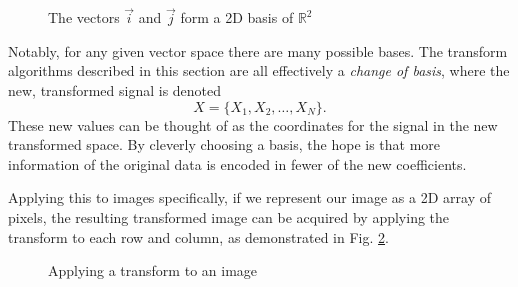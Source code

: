 \begin{figure}
    \centering
    
    \caption{The vectors $\vec{i}$ and $\vec{j}$ form a 2D basis of $\mathbb{R}^2$}
    \label{fig:2dbasis}
\end{figure}
Notably, for any given vector space there are many possible bases. The transform algorithms described in this section are all effectively a \textit{change of basis}, where the new, transformed signal is denoted
\begin{equation}
    X=\{X_1,X_2,\dots,X_N\}.\label{eq:tsig}
\end{equation}
These new values can be thought of as the coordinates for the signal in the new transformed space. By cleverly choosing a basis, the hope is that more information of the original data is encoded in fewer of the new coefficients.

Applying this to images specifically, if we represent our image as a 2D array of pixels, the resulting transformed image can be acquired by applying the transform to each row and column, as demonstrated in Fig. \ref{fig:2dtransform}.
\begin{figure}
    \centering
    
    \caption{Applying a transform to an image}
    \label{fig:2dtransform}
\end{figure}